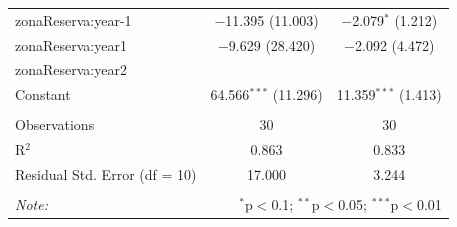 \documentclass[]{article}
\begin{document}
\begin{table}[!htbp]
\begin{tabular}{@{\extracolsep{1pt}}lcc}
  zonaReserva:year-1 & $-$11.395 (11.003) & $-$2.079$^{*}$ (1.212) \\ 
  zonaReserva:year1 & $-$9.629 (28.420) & $-$2.092 (4.472) \\ 
  zonaReserva:year2 &  &  \\ 
  Constant & 64.566$^{***}$ (11.296) & 11.359$^{***}$ (1.413) \\ 
 \hline \\[-1.8ex] 
Observations & 30 & 30 \\ 
R$^{2}$ & 0.863 & 0.833 \\ 
Residual Std. Error (df = 10) & 17.000 & 3.244 \\ 
\hline 
\hline \\[-1.8ex] 
\textit{Note:}  & \multicolumn{2}{r}{$^{*}$p$<$0.1; $^{**}$p$<$0.05; $^{***}$p$<$0.01} \\ 
\end{tabular} 
\end{table}
\end{document}
